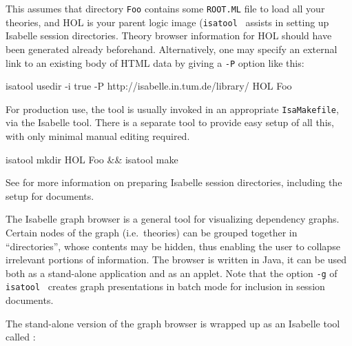 \begin{isabellebody}
\begin{isamarkuptext}
  This assumes that directory \verb|Foo| contains some \verb|ROOT.ML| file to load all your theories, and HOL is your parent
  logic image (\verb|isatool|~\hyperlink{tool.mkdir}{\mbox{}} assists in
  setting up Isabelle session directories.  Theory browser information
  for HOL should have been generated already beforehand.
  Alternatively, one may specify an external link to an existing body
  of HTML data by giving \hyperlink{tool.usedir}{\mbox{}} a \verb|-P| option like
  this:
\begin{ttbox}
isatool usedir -i true -P http://isabelle.in.tum.de/library/ HOL Foo
\end{ttbox}

  \medskip For production use, the \hyperlink{tool.usedir}{\mbox{}} tool is usually
  invoked in an appropriate \verb|IsaMakefile|, via the Isabelle
  \hyperlink{tool.make}{\mbox{}} tool.  There is a separate \hyperlink{tool.mkdir}{\mbox{}} tool to
  provide easy setup of all this, with only minimal manual editing
  required.
\begin{ttbox}
isatool mkdir HOL Foo && isatool make
\end{ttbox}
  See  for more information on preparing
  Isabelle session directories, including the setup for documents.%
\end{isamarkuptext}%
\isamarkuptrue%
%
\isamarkuptrue%
%
\begin{isamarkuptext}%

  The Isabelle graph browser is a general tool for visualizing
  dependency graphs.  Certain nodes of the graph (i.e.~theories) can
  be grouped together in ``directories'', whose contents may be
  hidden, thus enabling the user to collapse irrelevant portions of
  information.  The browser is written in Java, it can be used both as
  a stand-alone application and as an applet.  Note that the option
  \verb|-g| of \verb|isatool|~\hyperlink{tool.usedir}{\mbox{}} creates
  graph presentations in batch mode for inclusion in session
  documents.%
\end{isamarkuptext}%
\isamarkuptrue%
%
\isamarkuptrue%
%
\begin{isamarkuptext}%
The stand-alone version of the graph browser is wrapped up as an
  Isabelle tool called \hypertarget{tool.browser}{\hyperlink{tool.browser}{\mbox{}}}:


\end{isamarkuptext}
\end{isabellebody}
